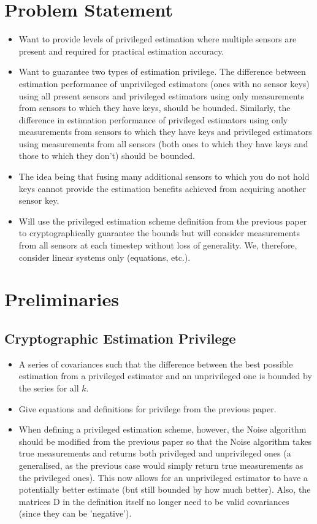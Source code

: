 \documentclass[conference]{IEEEtran}
\begin{document}
\section{Problem Statement}
\begin{itemize}
  \item Want to provide levels of privileged estimation where multiple sensors are present and required for practical estimation accuracy.
  \item Want to guarantee two types of estimation privilege. The difference between estimation performance of unprivileged estimators (ones with no sensor keys) using all present sensors and privileged estimators using only measurements from sensors to which they have keys, should be bounded. Similarly, the difference in estimation performance of privileged estimators using only measurements from sensors to which they have keys and privileged estimators using measurements from all sensors (both ones to which they have keys and those to which they don't) should be bounded.
  \item The idea being that fusing many additional sensors to which you do not hold keys cannot provide the estimation benefits achieved from acquiring another sensor key.
  \item Will use the privileged estimation scheme definition from the previous paper to cryptographically guarantee the bounds but will consider measurements from all sensors at each timestep without loss of generality. We, therefore, consider linear systems only (equations, etc.).
\end{itemize}


\section{Preliminaries}
\subsection{Cryptographic Estimation Privilege}
\begin{itemize}
  \item A series of covariances such that the difference between the best possible estimation from a privileged estimator and an unprivileged one is bounded by the series for all $k$.
  \item Give equations and definitions for privilege from the previous paper.
  \item When defining a privileged estimation scheme, however, the Noise algorithm should be modified from the previous paper so that the Noise algorithm takes true measurements and returns both privileged and unprivileged ones (a generalised, as the previous case would simply return true measurements as the privileged ones). This now allows for an unprivileged estimator to have a potentially better estimate (but still bounded by how much better). Also, the matrices D in the definition itself no longer need to be valid covariances (since they can be 'negative').
\end{itemize}
\end{document}
